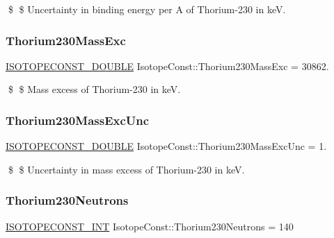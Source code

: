 \$ \$ Uncertainty in binding energy per A of Thorium-\/230 in keV. \mbox{\label{group___isotope_const-_thorium-_th230_ga6291f6c28c7ed9fc7cadefb3e54ed75a}} 
\subsubsection{\texorpdfstring{Thorium230\+Mass\+Exc}{Thorium230MassExc}}
{\footnotesize\ttfamily \mbox{\hyperlink{group___isotope_const-_macros_ga8f45a7272ce02c0b4c65c44636ed719a}{I\+S\+O\+T\+O\+P\+E\+C\+O\+N\+S\+T\+\_\+\+D\+O\+U\+B\+LE}} Isotope\+Const\+::\+Thorium230\+Mass\+Exc = 30862.}

\$ \$ Mass excess of Thorium-\/230 in keV. \mbox{\label{group___isotope_const-_thorium-_th230_ga76b9a3be026e242a70796acb10e1c352}} 
\subsubsection{\texorpdfstring{Thorium230\+Mass\+Exc\+Unc}{Thorium230MassExcUnc}}
{\footnotesize\ttfamily \mbox{\hyperlink{group___isotope_const-_macros_ga8f45a7272ce02c0b4c65c44636ed719a}{I\+S\+O\+T\+O\+P\+E\+C\+O\+N\+S\+T\+\_\+\+D\+O\+U\+B\+LE}} Isotope\+Const\+::\+Thorium230\+Mass\+Exc\+Unc = 1.}

\$ \$ Uncertainty in mass excess of Thorium-\/230 in keV. \mbox{\label{group___isotope_const-_thorium-_th230_ga2f79a60ab982e5b036e8f25e7d3a7c8c}} 
\subsubsection{\texorpdfstring{Thorium230\+Neutrons}{Thorium230Neutrons}}
{\footnotesize\ttfamily \mbox{\hyperlink{group___isotope_const-_macros_ga5f18360b3e99483a35c32d789e62621c}{I\+S\+O\+T\+O\+P\+E\+C\+O\+N\+S\+T\+\_\+\+I\+NT}} Isotope\+Const\+::\+Thorium230\+Neutrons = 140}


